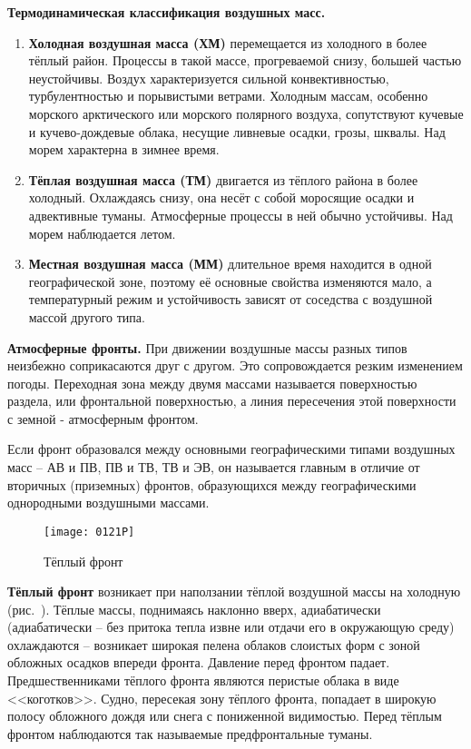\textbf{Термодинамическая классификация воздушных масс.}
\begin{enumerate}
\item \textbf{Холодная воздушная масса (ХМ)} перемещается из холодного
  в более тёплый район. Процессы в такой массе, прогреваемой снизу,
  большей частью неустойчивы. Воздух характеризуется сильной
  конвективностью, турбулентностью и порывистыми ветрами. Холодным
  массам, особенно морского арктического или морского полярного
  воздуха, сопутствуют кучевые и кучево-дождевые облака, несущие
  ливневые осадки, грозы, шквалы. Над морем характерна в зимнее время.
\item \textbf{Тёплая воздушная масса (ТМ)} двигается из тёплого района
  в более холодный. Охлаждаясь снизу, она несёт с собой моросящие
  осадки и адвективные туманы. Атмосферные процессы в ней обычно
  устойчивы. Над морем наблюдается летом.
\item \textbf{Местная воздушная масса (ММ)} длительное время находится
  в одной географической зоне, поэтому её основные свойства изменяются
  мало, а температурный режим и устойчивость зависят от соседства с
  воздушной массой другого типа.
\end{enumerate}

\textbf{Атмосферные фронты.} При движении
воздушные массы разных типов неизбежно соприкасаются друг с
другом. Это сопровождается резким изменением погоды. Переходная зона
между двумя массами называется поверхностью раздела, или фронтальной
поверхностью, а линия пересечения этой поверхности с земной -
атмосферным фронтом.

Если фронт образовался между основными географическими типами
воздушных масс \--- АВ и ПВ, ПВ и ТВ, ТВ и ЭВ, он называется главным в
отличие от вторичных (приземных) фронтов, образующихся между
географическими однородными воздушными массами.

\begin{figure*}
  \centering{}
  \texttt{[image: 0121P]}
  \caption{Тёплый фронт}
  \label{fig:121}
\end{figure*}

\textbf{Тёплый фронт} возникает при наползании
тёплой воздушной массы на холодную (рис.~). Тёплые массы,
поднимаясь наклонно вверх, адиабатически (адиабатически \--- без
притока тепла извне или отдачи его в окружающую среду) охлаждаются
\--- возникает широкая пелена облаков слоистых форм с зоной обложных
осадков впереди фронта. Давление перед фронтом
падает. Предшественниками тёплого фронта являются перистые облака в
виде <<коготков>>. Судно, пересекая зону тёплого фронта, попадает в
широкую полосу обложного дождя или снега с пониженной
видимостью. Перед тёплым фронтом наблюдаются так называемые
предфронтальные туманы.

